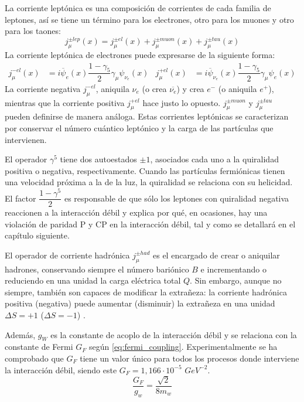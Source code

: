 La corriente leptónica es una composición de corrientes de cada familia de leptones, así se tiene un término para los electrones, otro para los muones y otro para los taones:
\begin{equation}
j_{\mu }^{\pm lep}\left( x\right) =j_{\mu }^{\pm el}\left( x\right) +j_{\mu }^{\pm muon}\left( x\right) +j_{\mu} ^{\pm tau}\left( x\right)\label{eq:leptonic_weak_current}
\end{equation}
La corriente leptónica de electrones puede expresarse de la siguiente forma:
\begin{align}
j_{\mu }^{-el}\left(x\right)&=i\overline{\psi}_{e}\left( x\right) \dfrac{1-\gamma_{5}}{2}\gamma _{\mu }\psi_{{ \nu}_{e}}\left( x\right) & j_{\mu}^{+el}\left(x\right)&= i\overline{\psi}_{{\nu}_{e}}\left(x\right) \dfrac{1-\gamma_{5}}{2}\gamma _{\mu}\psi_{e}\left( x\right)\label{eq:electric_weak_current}
\end{align}
La corriente negativa $j_{\mu }^{-el}$, aniquila $\nu_e$ (o crea $\overline{\nu_e}$) y crea $e^-$ (o aniquila $e^+$), mientras que la corriente positiva $j_{\mu }^{+el}$ hace justo lo opuesto. $j_{\mu }^{\pm muon}$ y $j_{\mu }^{\pm tau}$ pueden definirse de manera análoga. Estas corrientes leptónicas se caracterizan por conservar el número cuántico leptónico y la carga de las partículas que intervienen.

El operador $\gamma^5$ tiene dos autoestados $\pm 1$, asociados cada uno a la quiralidad positiva o negativa, respectivamente. Cuando las partículas fermiónicas tienen una velocidad próxima a la de la luz, la quiralidad se relaciona con su helicidad. El factor $\dfrac{1-\gamma^5}{2}$ es responsable de que sólo los leptones con quiralidad negativa reaccionen a la interacción débil y explica por qué, en ocasiones, hay una violación de paridad P y CP en la interacción débil, tal y como se detallará en el capítulo siguiente.

El operador de corriente hadrónica $j_{\mu} ^{\pm had}$ es el encargado de crear o aniquilar hadrones, conservando siempre el número bariónico $B$ e incrementando o reduciendo en una unidad la carga eléctrica total $Q$. Sin embargo, aunque no siempre, también son capaces de modificar la extrañeza: la corriente hadrónica positiva (negativa) puede aumentar (disminuir) la extrañeza en una unidad $\Delta S = +1$ ($\Delta S = -1$) \cite{notas2020}.

Además, $g_W$ es la constante de acoplo de la interacción débil y se relaciona con la constante de Fermi $G_F$ según \ref{eq:fermi_coupling}. Experimentalmente se ha comprobado que $G_F$ tiene un valor único para todos los procesos donde interviene la interacción débil, siendo este $G_{F}=1,166 \cdot 10^{-5}$ $GeV^{−2}$.
\begin{equation}
\dfrac{G_{F}}{g_{w}}=\dfrac{\sqrt{2}}{8m_{w}}\label{eq:fermi_coupling}
\end{equation}

